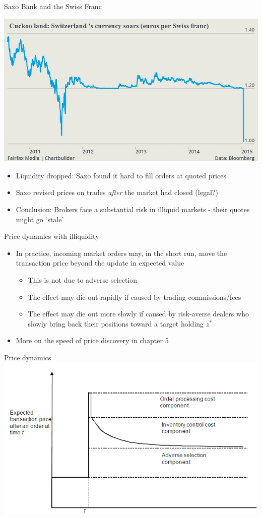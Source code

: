 \documentclass[english,10pt]{beamer}
\begin{document}
\begin{frame}{Saxo Bank and the Swiss Franc}
	\begin{center}
		\includegraphics[width=0.6\linewidth]{pics/Francageddon_Image}
	\end{center}
	\begin{itemize}
		\item Liquidity dropped: Saxo found it hard to fill orders at quoted prices
		\item Saxo revised prices on trades \textit{after} the market had closed (legal?)
		\item Conclusion: Brokers face a substantial risk in illiquid markets - their quotes might go `stale'
	\end{itemize}
\end{frame}


\begin{frame}{Price dynamics with illiquidity}
	\begin{itemize}
		\item In practice, incoming market orders may, in the short run, move the transaction price beyond the update in expected value
		\begin{itemize}
			\item This is not due to adverse selection
			\item The effect may die out rapidly if caused by trading commissions/fees
			\item The effect may die out more slowly if caused by risk-averse dealers who slowly bring back their positions toward a target holding $z^*$
		\end{itemize}
		\item More on the speed of price discovery in chapter 5
	\end{itemize}
\end{frame}


\begin{frame}{Price dynamics}
	\includegraphics[width=0.9\linewidth]{pics/PriceDiscovery_Image}
\end{frame}
\end{document}
